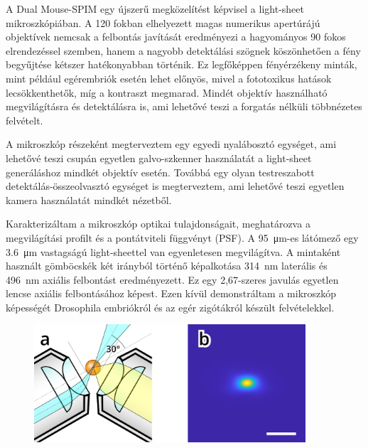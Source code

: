 \documentclass{booklet_style}
\begin{document}
    A Dual Mouse-SPIM egy újszerű megközelítést képvisel a light-sheet mikroszkópiában. A 120 fokban elhelyezett magas numerikus apertúrájú objektívek nemcsak a felbontás javítását eredményezi a hagyományos 90 fokos elrendezéssel szemben, hanem a nagyobb detektálási szögnek köszönhetően a fény begyűjtése kétszer hatékonyabban történik. Ez legfőképpen fényérzékeny minták, mint például egérembriók esetén lehet előnyös, mivel a fototoxikus hatások lecsökkenthetők, míg a kontraszt megmarad. Mindét objektív használható megvilágításra és detektálásra is, ami lehetővé teszi a forgatás nélküli többnézetes felvételt.

    A mikroszkóp részeként megterveztem egy egyedi nyalábosztó egységet, ami lehetővé teszi csupán egyetlen galvo-szkenner használatát a light-sheet generáláshoz mindkét objektív esetén. Továbbá egy olyan testreszabott detektálás-összeolvasztó egységet is megterveztem, ami lehetővé teszi egyetlen kamera használatát mindkét nézetből.

    Karakterizáltam a mikroszkóp optikai tulajdonságait, meghatározva a megvilágítási profilt és a pontátviteli függvényt (PSF).
    A \SI{95}{\micro m}-es látómező egy \SI{3,6}{\micro m} vastagságú light-sheettel van egyenletesen megvilágítva. A mintaként használt gömböcskék két irányból történő képalkotása \SI{314}{nm} laterális és \SI{496}{nm} axiális felbontást eredményezett. Ez egy 2,67-szeres javulás egyetlen lencse axiális felbontásához képest. Ezen kívül demonstráltam a  mikroszkóp képességét Drosophila embriókról és az egér zigótákról készült felvételekkel. 
    

    \begin{figure}
      \centering
      \includegraphics[width=0.9\textwidth]{2_DualMouse/120+psf}
      \label{fig:DualMouse}
    \end{figure}
\end{document}
